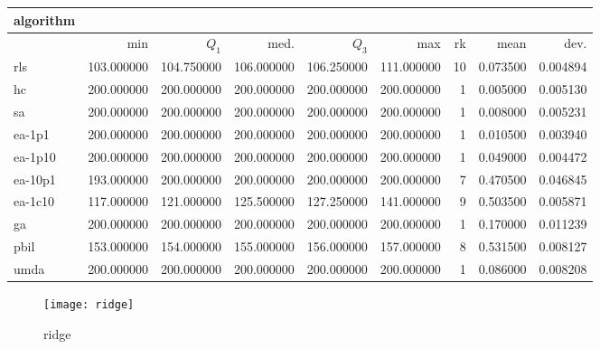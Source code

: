 \begin{center}
\begin{tabular}{@{}l*{5}{>{{}}N{3}{0}}>{{}}N{2}{0}N{1}{3}N{1}{3}@{}}
\toprule
{algorithm} &  &  \\
\midrule
& {min} & {$Q_1$} & {med.} & {$Q_3$} & {max} & {rk} & {mean} & {dev.} \\
\midrule
rls & 103.000000 & 104.750000 & 106.000000 & 106.250000 & 111.000000 & 10 & 0.073500 & 0.004894 \\
 hc & {\color{blue}} 200.000000 & {\color{blue}} 200.000000 & {\color{blue}} 200.000000 & {\color{blue}} 200.000000 & {\color{blue}} 200.000000 & 1 & 0.005000 & 0.005130 \\
 sa & {\color{blue}} 200.000000 & {\color{blue}} 200.000000 & {\color{blue}} 200.000000 & {\color{blue}} 200.000000 & {\color{blue}} 200.000000 & 1 & 0.008000 & 0.005231 \\
 ea-1p1 & {\color{blue}} 200.000000 & {\color{blue}} 200.000000 & {\color{blue}} 200.000000 & {\color{blue}} 200.000000 & {\color{blue}} 200.000000 & 1 & 0.010500 & 0.003940 \\
 ea-1p10 & {\color{blue}} 200.000000 & {\color{blue}} 200.000000 & {\color{blue}} 200.000000 & {\color{blue}} 200.000000 & {\color{blue}} 200.000000 & 1 & 0.049000 & 0.004472 \\
 ea-10p1 & 193.000000 & {\color{blue}} 200.000000 & {\color{blue}} 200.000000 & {\color{blue}} 200.000000 & {\color{blue}} 200.000000 & 7 & 0.470500 & 0.046845 \\
 ea-1c10 & 117.000000 & 121.000000 & 125.500000 & 127.250000 & 141.000000 & 9 & 0.503500 & 0.005871 \\
 ga & {\color{blue}} 200.000000 & {\color{blue}} 200.000000 & {\color{blue}} 200.000000 & {\color{blue}} 200.000000 & {\color{blue}} 200.000000 & 1 & 0.170000 & 0.011239 \\
 pbil & 153.000000 & 154.000000 & 155.000000 & 156.000000 & 157.000000 & 8 & 0.531500 & 0.008127 \\
 umda & {\color{blue}} 200.000000 & {\color{blue}} 200.000000 & {\color{blue}} 200.000000 & {\color{blue}} 200.000000 & {\color{blue}} 200.000000 & 1 & 0.086000 & 0.008208 \\
 \bottomrule
\end{tabular}
\end{center}

\begin{center}
\begin{figure}[h]
\centering
\texttt{[image: ridge]}
\caption{ridge}
\end{figure}
\end{center}


